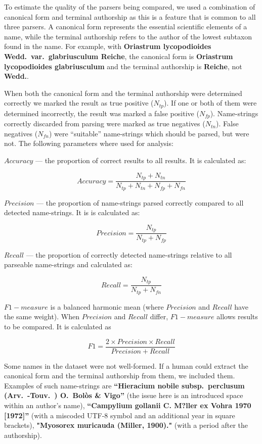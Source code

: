 \documentclass{bmcart}
\begin{document}
To estimate the quality of the parsers being compared, we used a combination of
canonical form and terminal authorship as this is a feature that is common to
all three parsers.  A canonical form represents the essential scientific
elements of a name, while the terminal authorship refers to the author of the
lowest subtaxon found in the name. For example, with \textbf{Oriastrum
  lycopodioides Wedd.\ var.\ glabriusculum Reiche}, the canonical form is
\textbf{Oriastrum lycopodioides glabriusculum} and the terminal authorship is
\textbf{Reiche}, not \textbf{Wedd.}.

When both the canonical form and the terminal authorship were determined
correctly we marked the result as true positive ($N_{tp}$).  If one or both of
them were determined incorrectly, the result was marked a false positive
($N_{fp}$). Name-strings correctly discarded from parsing were marked as true
negatives ($N_{tn}$). False negatives ($N_{fn}$) were ``suitable''
name-strings which should be parsed, but were not. The following parameters
where used for analysis:

$Accuracy$ --- the proportion of correct results to all results.  It is
calculated as:

\[Accuracy = \dfrac{N_{tp} + N_{tn}}{N_{tp} + N_{tn} + N_{fp} + N_{fn}}\]

$Precision$ --- the proportion of name-strings parsed correctly compared to
all detected name-strings. It is is calculated as:

\[Precision = \dfrac{N_{tp}}{N_{tp} + N_{fp}}\]

$Recall$ --- the proportion of correctly detected name-strings relative to
all parseable name-strings and calculated as:

\[Recall = \dfrac{N_{tp}}{N_{tp} + N_{fn}}\]

$F1-measure$ is a balanced harmonic mean (where $Precision$ and $Recall$ have
the same weight). When $Precision$ and $Recall$ differ, $F1-measure$ allows
results to be compared. It is calculated as

\[F1 = \dfrac{2 \times Precision \times Recall}{Precision + Recall}\]


Some names in the dataset were not well-formed. If a human could extract the
canonical form and the terminal authorship from them, we included them.
Examples of such name-strings are \textbf{``Hieracium nobile subsp.\ perclusum
(Arv.\ -Touv.\ ) O.\ Bolòs \& Vigo''} (the issue here is an introduced space
within an author's name), \textbf{``Campylium gollanii C. M?ller ex Vohra 1970
[1972]''} (with a miscoded UTF-8 symbol and an additional year in square
brackets), \textbf{"Myosorex muricauda (Miller, 1900)."} (with a period after
the authorship).
\end{document}
